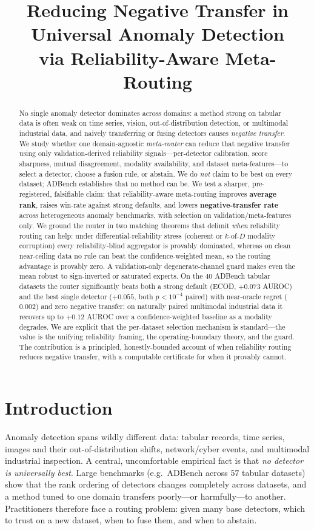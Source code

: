 \documentclass[11pt]{article}
\title{\textbf{Reducing Negative Transfer in Universal Anomaly Detection\\
via Reliability-Aware Meta-Routing}}
\author{}\date{}
\begin{document}
\maketitle

\begin{abstract}
No single anomaly detector dominates across domains: a method strong on tabular
data is often weak on time series, vision, out-of-distribution detection, or
multimodal industrial data, and naively transferring or fusing detectors causes
\emph{negative transfer}. We study whether one domain-agnostic \emph{meta-router}
can reduce that negative transfer using only validation-derived reliability
signals---per-detector calibration, score sharpness, mutual disagreement, modality
availability, and dataset meta-features---to select a detector, choose a fusion
rule, or abstain. We do \emph{not} claim to be best on every dataset; ADBench
establishes that no method can be. We test a sharper, pre-registered, falsifiable
claim: that reliability-aware meta-routing improves \textbf{average rank}, raises
win-rate against strong defaults, and lowers \textbf{negative-transfer rate} across
heterogeneous anomaly benchmarks, with selection on validation/meta-features only.
We ground the router in two matching theorems that delimit \emph{when} reliability
routing can help: under differential-reliability stress (coherent or $k$-of-$D$
modality corruption) every reliability-blind aggregator is provably dominated,
whereas on clean near-ceiling data no rule can beat the confidence-weighted mean,
so the routing advantage is provably zero. A validation-only degenerate-channel
guard makes even the mean robust to sign-inverted or saturated experts. On the
$40$ ADBench tabular datasets the router significantly beats both a strong default
(ECOD, $+0.073$ AUROC) and the best single detector ($+0.055$, both $p<10^{-4}$
paired) with near-oracle regret ($0.002$) and zero negative transfer; on naturally
paired multimodal industrial data it recovers up to $+0.12$ AUROC over a
confidence-weighted baseline as a modality degrades. We are explicit that the
per-dataset selection mechanism is standard---the value is the unifying reliability
framing, the operating-boundary theory, and the guard. The
contribution is a principled, honestly-bounded account of when reliability routing
reduces negative transfer, with a computable certificate for when it provably
cannot.
\end{abstract}

\section{Introduction}
Anomaly detection spans wildly different data: tabular records, time series,
images and their out-of-distribution shifts, network/cyber events, and multimodal
industrial inspection. A central, uncomfortable empirical fact is that
\emph{no detector is universally best}. Large benchmarks (e.g.\ ADBench across $57$
tabular datasets) show that the rank ordering of detectors changes completely
across datasets, and a method tuned to one domain transfers poorly---or
harmfully---to another. Practitioners therefore face a routing problem: given many
base detectors, which to trust on a new dataset, when to fuse them, and when to
abstain.
\end{document}
